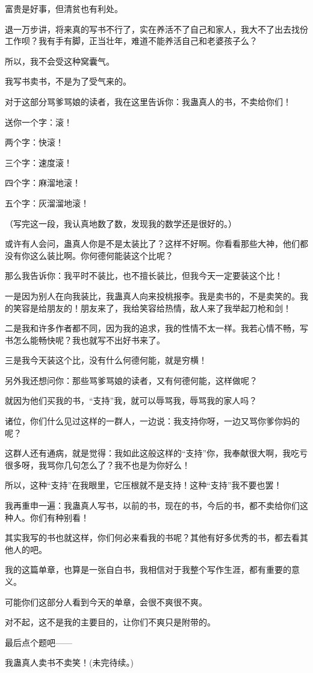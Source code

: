 \begin{this_body}
富贵是好事，但清贫也有利处。

退一万步讲，将来真的写书不行了，实在养活不了自己和家人，我大不了出去找份工作呗？我有手有脚，正当壮年，难道不能养活自己和老婆孩子么？

所以，我不会受这种窝囊气。

我写书卖书，不是为了受气来的。

对于这部分骂爹骂娘的读者，我在这里告诉你：我蛊真人的书，不卖给你们！

送你一个字：滚！

两个字：快滚！

三个字：速度滚！

四个字：麻溜地滚！

五个字：灰溜溜地滚！

（写完这一段，我认真地数了数，发现我的数学还是很好的。）

或许有人会问，蛊真人你是不是太装比了？这样不好啊。你看看那些大神，他们都没有你这么装比啊。你何德何能装这个比呢？

那么我告诉你：我平时不装比，也不擅长装比，但我今天一定要装这个比！

一是因为别人在向我装比，我蛊真人向来投桃报李。我是卖书的，不是卖笑的。我的笑容是给朋友的！朋友来了，我给笑容给热情，敌人来了我举起刀枪和剑！

二是我和许多作者都不同，因为我的追求，我的性情不太一样。我若心情不畅，写书怎么能畅快呢？我也就写不出好书来了。

三是我今天装这个比，没有什么何德何能，就是穷横！

另外我还想问你：那些骂爹骂娘的读者，又有何德何能，这样做呢？

就因为他们买我的书，“支持”我，就可以辱骂我，辱骂我的家人吗？

诸位，你们什么见过这样的一群人，一边说：我支持你呀，一边又骂你爹你妈的呢？

这群人还有通病，就是觉得：我如此这般这样的“支持”你，我奉献很大啊，我吃亏很多呀，我骂你几句怎么了？我不也是为你好么！

所以，这种“支持”在我眼里，它压根就不是支持！这种“支持”我不要也罢！

我再重申一遍：我蛊真人写书，以前的书，现在的书，今后的书，都不卖给你们这种人。你们有种别看！

其实我写的书也就这样，你们何必来看我的书呢？其他有好多优秀的书，都去看其他人的吧。

我的这篇单章，也算是一张自白书，我相信对于我整个写作生涯，都有重要的意义。

可能你们这部分人看到今天的单章，会很不爽很不爽。

对不起，这不是我的主要目的，让你们不爽只是附带的。

最后点个题吧——

我蛊真人卖书不卖笑！(未完待续。)

\end{this_body}

